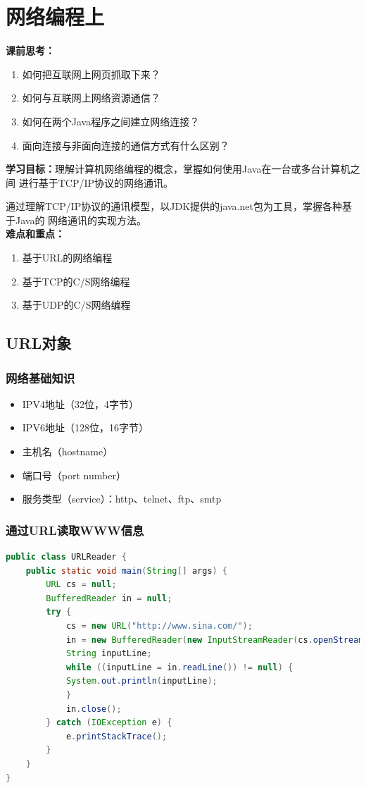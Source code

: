 \chapter{网络编程上}
\noindent\textbf{课前思考：}
\begin{enumerate}
	\item 如何把互联网上网页抓取下来？
	\item 如何与互联网上网络资源通信？
	\item 如何在两个Java程序之间建立网络连接？
	\item 面向连接与非面向连接的通信方式有什么区别？
\end{enumerate}
\textbf{学习目标：}理解计算机网络编程的概念，掌握如何使用Java在一台或多台计算机之间
进行基于TCP/IP协议的网络通讯。
\par 通过理解TCP/IP协议的通讯模型，以JDK提供的java.net包为工具，掌握各种基于Java的
网络通讯的实现方法。
\\ \textbf{难点和重点：}
\begin{enumerate}
	\item 基于URL的网络编程
	\item 基于TCP的C/S网络编程
	\item 基于UDP的C/S网络编程
\end{enumerate}

\section{URL对象}
\subsection{网络基础知识}
\begin{itemize}
	\item IPV4地址（32位，4字节）
	\item IPV6地址（128位，16字节）
	\item 主机名（hostname）
	\item 端口号（port number）
	\item 服务类型（service）：http、telnet、ftp、smtp
\end{itemize}
\subsection{通过URL读取WWW信息}
\begin{lstlisting}[language=java]
public class URLReader {
	public static void main(String[] args) {
		URL cs = null;
		BufferedReader in = null;
		try {
			cs = new URL("http://www.sina.com/");
			in = new BufferedReader(new InputStreamReader(cs.openStream()));
			String inputLine;
			while ((inputLine = in.readLine()) != null) {
			System.out.println(inputLine);
			}
			in.close();
		} catch (IOException e) {
			e.printStackTrace();
		}
	}
}
\end{lstlisting}
